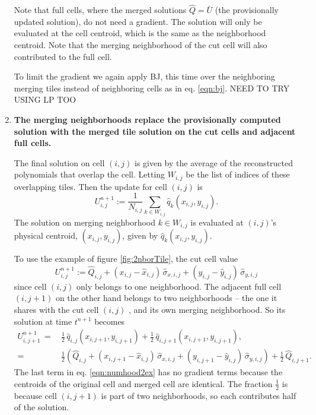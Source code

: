 \begin{enumerate}
Note that full cells, where the merged  solutions $\widehat{Q} =
\bar{U}$ (the
provisionally updated solution), do not need a gradient. The solution will only be
evaluated at the cell centroid, which is the same as the neighborhood centroid. 
Note that the merging neighborhood of the cut cell will
also contributed to the full cell.

To limit the gradient we again apply BJ, this time over the neighboring merging tiles 
instead of neighboring cells as in eq. \eqref{eqn:bj}.  NEED TO TRY USING LP TOO


\item
{\bf The merging neighborhoods replace the provisionally computed solution 
with the merged tile solution on the cut cells and adjacent full cells.} 

\vspace*{.1in}
The final solution on cell $(i,j)$ is given by the average of the 
reconstructed polynomials that overlap the cell. Letting $W_{i,j}$ be the list of
indices of these overlapping tiles. Then the update for cell $(i,j)$ is
\begin{equation} \label{eqn:final_update_linear}
U^{n+1}_{i,j} := \frac{1}{N_{i,j}}\sum_{k \in W_{i,j}}\hat{q}_{k}(x_{i,j},y_{i,j}).
\end{equation}
The solution on merging neighborhood $k \in W_{i,j}$ is evaluated at $(i,j)$'s 
physical centroid, $(x_{i,j},y_{i,j})$, given by $\hat{q}_{k}(x_{i,j},y_{i,j})$.  

To use the example of figure \ref{fig:2nborTile}, the cut cell value
\begin{equation}
   U_{i,j}^{n+1} := \widehat{Q}_{i,j} 
   + ( x_{i,j} - \widehat x_{i,j}) \, \widehat{\sigma}_{x,i,j}
   + ( y_{i,j} - \widehat y_{i,j}) \, \widehat{\sigma}_{y,i,j}
\end{equation}
since cell $(i,j)$ only belongs to one neighborhood. The adjacent full cell
$(i,j+1)$ on the other hand belongs to two neighborhoods -- the one it 
shares with
the cut cell $(i,j)$ , and its own merging neighborhood.
So its solution at time $t^{n+1}$  becomes
\begin{equation}
\label{eqn:numhood2ex}
\begin{split}
   U_{i,j+1}^{n+1} \,=\, & \frac{1}{2} \, \widehat{q}_{i,j}(x_{i,j+1},y_{i,j+1})+ 
   \frac{1}{2} \,  \widehat{q}_{i,j+1}(x_{i,j+1},y_{i,j+1}), \\
   = &\frac{1}{2} \left
   (\widehat{Q}_{i,j} 
   + ( x_{i,j+1} - \widehat x_{i,j}) \, \widehat{\sigma}_{x,i,j}
   + ( y_{i,j+1} - \widehat y_{i,j}) \, \widehat{\sigma}_{y,i,j} \right ) + 
   \frac{1}{2} \, \widehat{Q}_{i,j+1} .
\end{split}
\end{equation}
The last term  in eq. \eqref{eqn:numhood2ex} has no gradient terms because the
centroids of the original cell and merged cell are identical.
The fraction $\frac{1}{2}$ is because cell $(i,j+1)$ is part of  two
neighborhoods, so each contributes half of the solution.
\end{enumerate}

